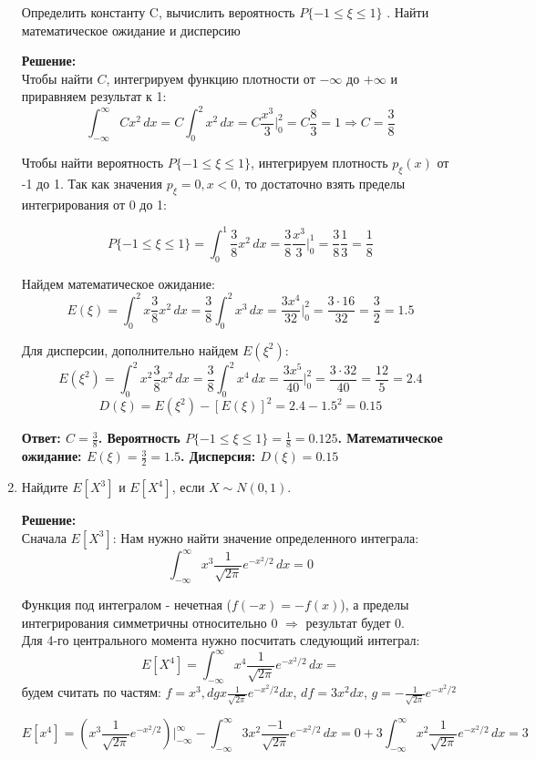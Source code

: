 \documentclass[a4paper,12pt]{article}
\renewcommand{\leq}{\leqslant}
\begin{document}
\begin{enumerate}
Определить константу C, вычислить вероятность $P\{ -1\leq \xi\leq1\}$ . Найти математическое ожидание и дисперсию

\textbf{Решение:}\\
Чтобы найти $C$, интегрируем функцию плотности от $-\infty$ до $+\infty$ и приравняем результат к 1:
$$\int_{-\infty}^{\infty} Cx^2\,dx=C\int_{0}^{2} x^2\,dx=C \frac{x^3}{3}\Big|_0^2=C\frac{8}{3}=1 \Rightarrow C = \frac{3}{8}$$

Чтобы найти вероятность $P\{ -1\leq \xi\leq1\}$, интегрируем плотность $p_{\xi}(x)$ от -1 до 1. Так как значения $p_{\xi}=0, x<0$, то достаточно взять пределы интегрирования от 0 до 1:

$$P\{ -1\leq \xi\leq1\}= \int_{0}^{1} \frac{3}{8}x^2\,dx=\frac{3}{8}\frac{x^3}{3}\Big|_0^1=\frac{3}{8}\frac{1}{3}=\frac{1}{8}$$

Найдем математическое ожидание:
$$E(\xi) = \int_{0}^{2} x \frac{3}{8} x^2\,dx=\frac{3}{8} \int_{0}^{2}  x^3\,dx=\frac{3x^4}{32}\Big|_0^2=\frac{3\cdot16}{32}=\frac{3}{2}=1.5$$

Для дисперсии, дополнительно найдем $E(\xi^2)$:
$$E(\xi^2) = \int_{0}^{2} x^2 \frac{3}{8} x^2\,dx=\frac{3}{8} \int_{0}^{2}  x^4\,dx=\frac{3x^5}{40}\Big|_0^2=\frac{3\cdot32}{40}=\frac{12}{5}=2.4$$
$$D(\xi)=E(\xi^2)-[E(\xi)]^2=2.4-1.5^2=0.15$$

\textbf{Ответ: $C = \frac{3}{8}$. Вероятность $P\{ -1\leq \xi\leq1\}=\frac{1}{8}=0.125$. Математическое ожидание: $E(\xi)=\frac{3}{2}=1.5$. Дисперсия: $D(\xi)=0.15$} 

\item  Найдите  $E[X^3]$ и $E[X^4]$, если $X \sim	 N(0,1)$.


\textbf{Решение:}\\
Сначала $E[X^3]$:
Нам нужно найти значение определенного интеграла: 
$$  \int_{-\infty}^{\infty}  x^3 \frac{1}{\sqrt{2 \pi}} e^{-x^2 /2  }\,dx=0$$

Функция под интегралом - нечетная ($f(-x)=-f(x)$), а пределы интегрирования симметричны относительно 0 $\Rightarrow$ результат будет 0.\\

Для 4-го центрального момента нужно посчитать следующий интеграл:
$$ E[X^4]= \int_{-\infty}^{\infty}  x^4 \frac{1}{\sqrt{2 \pi}} e^{-x^2 /2  }\,dx=$$
будем считать по частям: $f=x^3, dg  x \frac{1}{\sqrt{2 \pi}} e^{-x^2 /2  } dx$, $df = 3x^2 dx$, $g = - \frac{1}{\sqrt{2 \pi}} e^{-x^2 /2  } $

$$E[x^4]=(x^3  \frac{1}{\sqrt{2 \pi}} e^{-x^2 /2  })\Big|_{-\infty}^{\infty}-\int_{-\infty}^{\infty}  3x^2 \frac{-1}{\sqrt{2 \pi}} e^{-x^2 /2  }\,dx=0+3\int_{-\infty}^{\infty}  x^2 \frac{1}{\sqrt{2 \pi}} e^{-x^2 /2  }\,dx=3$$


\end{enumerate}
\end{document}
